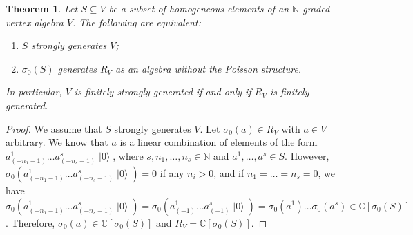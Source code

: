 \documentclass[a4paper, 12pt, reqno]{amsart}
\newtheorem{theorem}{Theorem}[section]
\theoremstyle{remark}
\DeclareMathOperator{\vac}{|0\rangle}
\begin{document}
\begin{theorem}
  \label{thr:55}
  Let $S \subseteq V$ be a subset of homogeneous elements of an $\mathbb{N}$-graded vertex algebra $V$.
  The following are equivalent:
  \begin{enumerate}
  \item $S$ strongly generates $V$;
  \item $\sigma_0(S)$ generates $R_V$ as an algebra without the Poisson structure.
  \end{enumerate}
  In particular, $V$ is finitely strongly generated if and only if $R_V$ is finitely generated.
\end{theorem}

\begin{proof}
  We assume that $S$ strongly generates $V$.
  Let $\sigma_0(a) \in R_V$ with $a \in V$ arbitrary.
  We know that $a$ is a linear combination of elements of the form $a^1_{(-n_1 - 1)}\dots a^s_{(-n_s - 1)}\vac$, where $s, n_1, \dots, n_s \in \mathbb{N}$ and $a^1, \dots, a^s \in S$.
  However, $\sigma_0(a^1_{(-n_1 - 1)}\dots a^s_{(-n_s - 1)}\vac) = 0$ if any $n_i > 0$, and if $n_1 = \dots = n_s = 0$, we have $\sigma_0(a^1_{(-n_1 - 1)}\dots a^s_{(-n_s - 1)}\vac) = \sigma_0(a^1_{(-1)}\dots a^s_{(-1)}\vac) = \sigma_0(a^1)\dots\sigma_0(a^s) \in \mathbb{C}[\sigma_0(S)]$.
  Therefore, $\sigma_0(a) \in \mathbb{C}[\sigma_0(S)]$ and $R_V = \mathbb{C}[\sigma_0(S)]$.


\end{proof}
\end{document}
